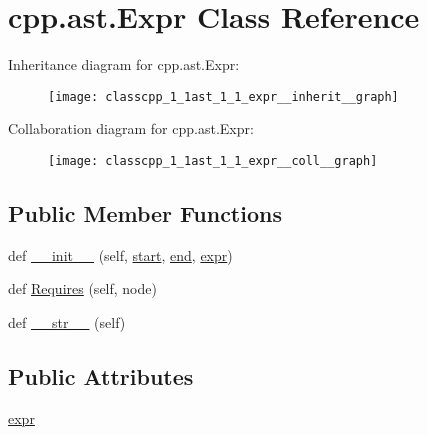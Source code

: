 \hypertarget{classcpp_1_1ast_1_1_expr}{}\section{cpp.\+ast.\+Expr Class Reference}
\label{classcpp_1_1ast_1_1_expr}


Inheritance diagram for cpp.\+ast.\+Expr\+:
\nopagebreak
\begin{figure}[H]
\begin{center}
\leavevmode
\texttt{[image: classcpp\_1\_1ast\_1\_1\_expr\_\_inherit\_\_graph]}
\end{center}
\end{figure}


Collaboration diagram for cpp.\+ast.\+Expr\+:
\nopagebreak
\begin{figure}[H]
\begin{center}
\leavevmode
\texttt{[image: classcpp\_1\_1ast\_1\_1\_expr\_\_coll\_\_graph]}
\end{center}
\end{figure}
\subsection*{Public Member Functions}
\begin{DoxyCompactItemize}
\item 
def \hyperlink{classcpp_1_1ast_1_1_expr_adc83f4b17d6e28a39781678692eb25aa}{\+\_\+\+\_\+init\+\_\+\+\_\+} (self, \hyperlink{classcpp_1_1ast_1_1_node_a7b2aa97e6a049bb1a93aea48c48f1f44}{start}, \hyperlink{classcpp_1_1ast_1_1_node_a3c5e5246ccf619df28eca02e29d69647}{end}, \hyperlink{classcpp_1_1ast_1_1_expr_a2f4e13fb0176f2616f8703103c806462}{expr})
\item 
def \hyperlink{classcpp_1_1ast_1_1_expr_a9c92416eb1285068f190dcda8fd33682}{Requires} (self, node)
\item 
def \hyperlink{classcpp_1_1ast_1_1_expr_a7ee1896fbfa7819adbd0b2f89d11ecec}{\+\_\+\+\_\+str\+\_\+\+\_\+} (self)
\end{DoxyCompactItemize}
\subsection*{Public Attributes}
\begin{DoxyCompactItemize}
\item 
\hyperlink{classcpp_1_1ast_1_1_expr_a2f4e13fb0176f2616f8703103c806462}{expr}
\end{DoxyCompactItemize}


